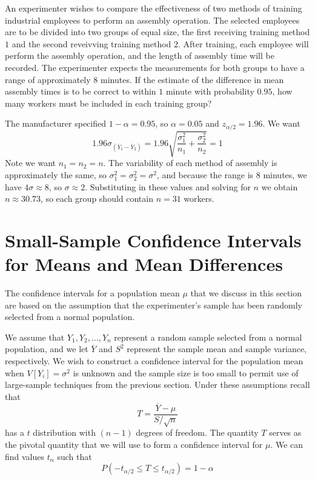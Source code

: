 \documentclass[12pt, a4paper, twoside, openright, titlepage]{book}
\begin{document}
\begin{eg}{}{}
    An experimenter wishes to compare the effectiveness of two methods of training industrial employees to perform an assembly operation. The selected employees are to be divided into two groups of equal size, the first receiving training method $1$ and the second reveivving training method $2$. After training, each employee will perform the assembly operation, and the length of assembly time will be recorded. The experimenter expects the measurements for both groups to have a range of approximately $8$ minutes. If the estimate of the difference in mean assembly times is to be correct to within $1$ minute with probability $0.95$, how many workers must be included in each training group?


    The manufacturer specified $1- \alpha = 0.95$, so $\alpha = 0.05$ and $z_{\alpha/2} = 1.96$. We want \begin{equation*}
        1.96\sigma_{(\overline{Y}_1 - \overline{Y}_2)} = 1.96\sqrt{\frac{\sigma_1^2}{n_1} + \frac{\sigma_2^2}{n_2}} = 1
    \end{equation*}
    Note we want $n_1 = n_2 = n$. The variability of each method of assembly is approximately the same, so $\sigma_1^2 = \sigma_2^2 = \sigma^2$, and because the range is $8$ minutes, we have $4\sigma \approx 8$, so $\sigma \approx 2$. Substituting in these values and solving for $n$ we obtain $n \approx 30.73$, so each group should contain $n = 31$ workers.
\end{eg}


\section{\textsection Small-Sample Confidence Intervals for Means and Mean Differences}

The confidence intervals for a population mean $\mu$ that we discuss in this section are based on the assumption that the experimenter's sample has been randomly selected from a normal population.

We assume that $Y_1,Y_2,...,Y_n$ represent a random sample selected from a normal population, and we let $\overline{Y}$ and $S^2$ represent the sample mean and sample variance, respectively. We wish to construct a confidence interval for the population mean when $V[Y_i] = \sigma^2$ is unknown and the sample size is too small to permit use of large-sample techniques from the previous section. Under these assumptions recall that \begin{equation*}
    T = \frac{\overline{Y} - \mu}{S/\sqrt{n}}
\end{equation*}
has a $t$ distribution with $(n-1)$ degrees of freedom. The quantity $T$ serves as the pivotal quantity that we will use to form a confidence interval for $\mu$. We can find values $t_{\alpha}$ such that \begin{equation*}
    P(-t_{\alpha/2} \leq T \leq t_{\alpha/2}) = 1-\alpha
\end{equation*}
\end{document}
